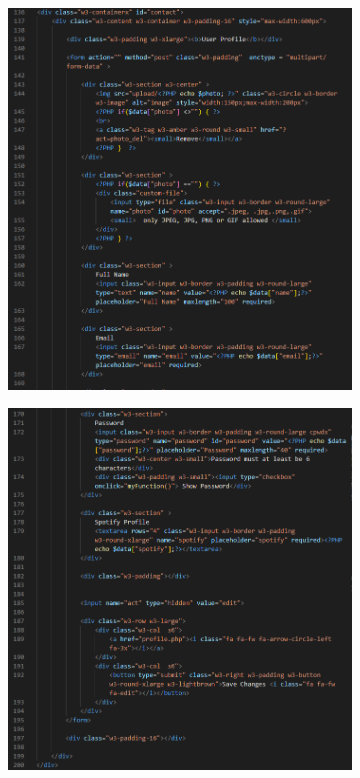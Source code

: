 \begin{enumerate}[1.]
    \clearpage
    \begin{figure}[h]\ContinuedFloat
        \centering
        \begin{subfigure}[b]{0.7\textwidth}
            \centering
            \includegraphics[width=\textwidth]{mainmatter/images/frontend/code/editprofile.png}
            \label{fig:sub1}
        \end{subfigure}
        \hspace{0.05\textwidth}
        \begin{subfigure}[b]{0.7\textwidth}
            \centering
            \includegraphics[width=\textwidth]{mainmatter/images/frontend/code/editprofile2.png}

\end{subfigure}
\end{figure}
\end{enumerate}
